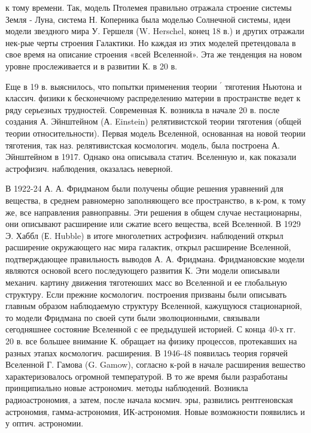 \documentclass[10pt]{article}
\begin{document}
к тому времени. Так, модель Птолемея правильно отражала строение системы Земля - Луна, система Н. Коперника была моделью Солнечной системы, идеи модели звездного мира У. Гершеля (W. Herschel, конец 18 в.) и других отражали нек-рые черты строения Галактики. Но каждая из этих моделей претендовала в свое время на описание строения «всей Вселенной». Эта же тенденция на новом уровне прослеживается и в развитии К. в 20 в.



Еще в 19 в. выяснилось, что попытки применения теории ${ }^{\prime}$ тяготения Ньютона и классич. физики к бесконечному распределению материи в пространстве ведет к ряду серьезных трудностей. Современная К. возникла в начале 20 в. после создания А. Эйнштейном (А. Einstein) релятивистской теории тяготения (общей теории относительности). Первая модель Вселенной, основанная на новой теории тяготения, так наз. релятивистская космологич. модель, была построена А. Эйнштейном в 1917. Однако она описывала статич. Вселенную и, как показали астрофизич. наблюдения, оказалась неверной.



В 1922-24 А. А. Фридманом были получены общие решения уравнений для вещества, в среднем равномерно заполняющего все пространство, в к-ром, к тому же, все направления равноправны. Эти решения в общем случае нестационарны, они описывают расширение или сжатие всего вещества, всей Вселенной. В 1929 Э. Хаббл (Е. Hubble) в итоге многолетних астрофизич. наблюдений открыл расширение окружающего нас мира галактик, открыл расширение Вселенной, подтверждающее правильность выводов А. А. Фридмана. Фридмановские модели являются основой всего последующего развития К. Эти модели описывали механич. картину движения тяготеюших масс во Вселенной и ее глобальную структуру. Если прежние космологич. построения призваны были описывать главным образом наблюдаемую структуру Вселенной, кажущуюся стационарной, то модели Фридмана по своей сути были эволюционными, связывали сегодняшнее состояние Вселенной с ее предыдушей историей. С конца 40-х гг. 20 в. все большее внимание К. обращает на физику процессов, протекавших на разных этапах космологич. расширения. В 1946-48 появилась теория горячей Вселенной Г. Гамова (G. Gamow), согласно к-рой в начале расширения вешество характеризовалось огромной температурой. В то же время были разработаны принципиально новые астрономич. методы наблюдений. Возникла радиоастрономия, а затем, после начала космич. эры, развились рентгеновская астрономия, гамма-астрономия, ИК-астрономия. Новые возможности появились и у оптич. астрономии.
\end{document}
